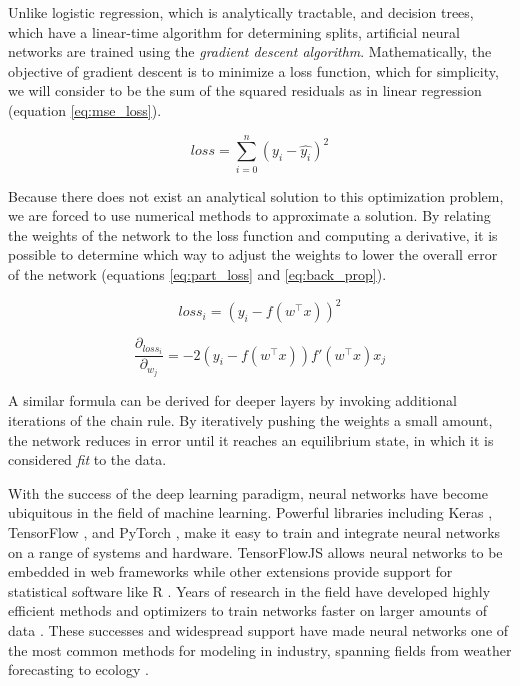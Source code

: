 Unlike logistic regression, which is analytically tractable, and decision trees, which have a linear-time algorithm for determining splits, artificial neural networks are trained using the \textit{gradient descent algorithm}. Mathematically, the objective of gradient descent is to minimize a loss function, which for simplicity, we will consider to be the sum of the squared residuals as in linear regression (equation \ref{eq:mse_loss}). 

\begin{equation}
    \label{eq:mse_loss}
    loss = \sum_{i=0}^{n}{(y_i-\hat{y_i})^2}
\end{equation}

Because there does not exist an analytical solution to this optimization problem, we are forced to use numerical methods to approximate a solution. By relating the weights of the network to the loss function and computing a derivative, it is possible to determine which way to adjust the weights to lower the overall error of the network (equations \ref{eq:part_loss} and \ref{eq:back_prop}).

\begin{equation}
    \label{eq:part_loss}
    loss_i = (y_i-f(w^\top x))^2
\end{equation}

\begin{equation}
    \label{eq:back_prop}
    \frac{\partial_{loss_i}}{\partial_{w_j}} = -2 (y_i - f(w^\top x)) f'(w^\top x) x_j
\end{equation}

A similar formula can be derived for deeper layers by invoking additional iterations of the chain rule. By iteratively pushing the weights a small amount, the network reduces in error until it reaches an equilibrium state, in which it is considered \textit{fit} to the data. 

With the success of the deep learning paradigm, neural networks have become ubiquitous in the field of machine learning. Powerful libraries including Keras \citep{Chollet2019Keras}, TensorFlow \citep{Martin2015TensorFlowSystems}, and PyTorch \citep{Paszke2017AutomaticPyTorch}, make it easy to train and integrate neural networks on a range of systems and hardware. TensorFlowJS \citep{TensorFlow2019TensorFlow.js} allows neural networks to be embedded in web frameworks while other extensions provide support for statistical software like R \citep{Allaire2019RTensorFlow}. Years of research in the field have developed highly efficient methods and optimizers to train networks faster on larger amounts of data \citep{Kingma2014Adam:Optimization}. These successes and widespread support have made neural networks one of the most common methods for modeling in industry, spanning fields from weather forecasting \citep{Lagerquist2017MachineWind} to ecology \citep{Chilson2019AutomatedNetworks}. 


